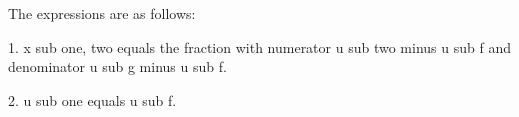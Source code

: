 The expressions are as follows:

1. x sub one, two equals the fraction with numerator u sub two minus u sub f and denominator u sub g minus u sub f.

2. u sub one equals u sub f.